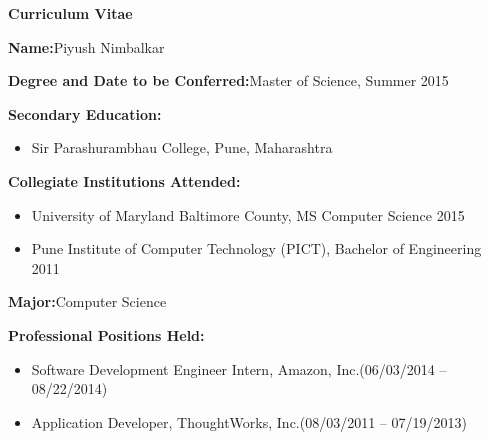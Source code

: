 \begin{titlepage}

\begin{center}
\vspace{0.1in}
\large{\bf Curriculum Vitae}
\bigskip \bigskip
\end{center}

\begin{flushleft}
	{\bf Name:}{\hspace{3mm}}Piyush Nimbalkar\\
	\vspace{6pt}
	
	{\bf Degree and Date to be Conferred:}{\hspace{3mm}}Master of Science, Summer 2015 \\
	\vspace{6pt}
	
	{\bf Secondary Education:}
	\begin{itemize}
	\item{{\hspace{3mm}}Sir Parashurambhau College, Pune, Maharashtra}\\
	\end{itemize}
	\vspace{6pt}
	
	{\bf Collegiate Institutions Attended:}
	\begin{itemize}
	\item{University of Maryland Baltimore County, MS Computer Science \hfill 2015}\\
	\item{Pune Institute of Computer Technology (PICT), Bachelor of Engineering \hfill 2011}\\
	\end{itemize}
	\vspace{6pt}
	
	{\bf Major:}{\hspace{3mm}}Computer Science\\
	\vspace{6pt}
	
	{\bf Professional Positions Held:}
	\begin{itemize}
	\item{Software Development Engineer Intern, Amazon, Inc.\hfill (06/03/2014 -- 08/22/2014)}\\
	\item{Application Developer, ThoughtWorks, Inc.\hfill (08/03/2011 -- 07/19/2013)}\\
	\end{itemize}
\end{flushleft}
       
\end{titlepage}
\par\vfil


